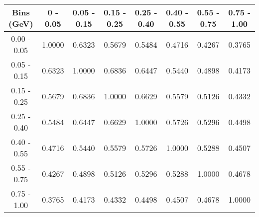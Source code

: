 \documentclass[aps, prd, reprint,showpacs,  preprintnumbers,amsmath,amssymb,superscriptaddress, nofootinbib]{revtex4-1}
\makeatletter
\renewenvironment{table}
  {\def\@captype{table}}
  {}
\makeatother
\begin{document}
\begin{table}
\centering
\begin{tabular}{cccccccc}
\hline
Bins (GeV) & 0 - 0.05 & 0.05 - 0.15 & 0.15 - 0.25 & 0.25 - 0.40 & 0.40 - 0.55 & 0.55 - 0.75 & 0.75 - 1.00 \\ 
\hline
  0.00 -   0.05    &    1.0000   &    0.6323   &    0.5679   &    0.5484   &    0.4716   &    0.4267   &    0.3765    \\
  0.05 -   0.15    &    0.6323   &    1.0000   &    0.6836   &    0.6447   &    0.5440   &    0.4898   &    0.4173    \\
  0.15 -   0.25    &    0.5679   &    0.6836   &    1.0000   &    0.6629   &    0.5579   &    0.5126   &    0.4332    \\
  0.25 -   0.40    &    0.5484   &    0.6447   &    0.6629   &    1.0000   &    0.5726   &    0.5296   &    0.4498    \\
  0.40 -   0.55    &    0.4716   &    0.5440   &    0.5579   &    0.5726   &    1.0000   &    0.5288   &    0.4507    \\
  0.55 -   0.75    &    0.4267   &    0.4898   &    0.5126   &    0.5296   &    0.5288   &    1.0000   &    0.4678    \\
  0.75 -   1.00    &    0.3765   &    0.4173   &    0.4332   &    0.4498   &    0.4507   &    0.4678   &    1.0000    \\
\hline
\hline
\end{tabular}
\caption{Correlation matrix for bins of $d\sigma/dT_\pi$.}
\label{tb:pi0_kinetic_cov}
\end{table}

\vspace{1cm}
\end{document}
